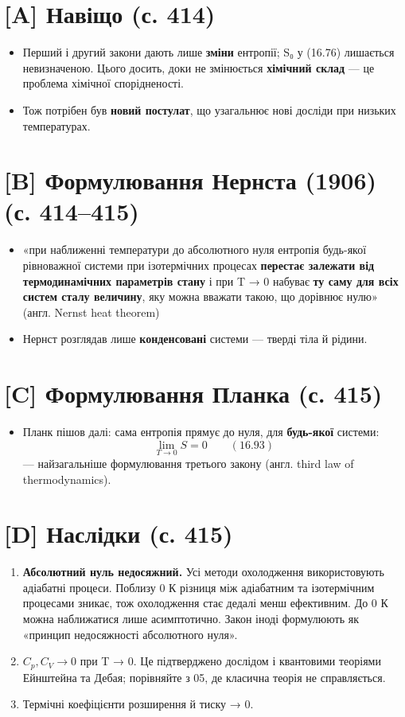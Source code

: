\documentclass[11pt,a4paper,oneside]{book}
\begin{document}
\section*{[A] Навіщо (с. 414)}
\begin{itemize}
\item Перший і другий закони дають лише \textbf{зміни} ентропії; S₀ у (16.76) лишається невизначеною. Цього досить, доки не змінюється \textbf{хімічний склад} — це проблема хімічної спорідненості.
\item Тож потрібен був \textbf{новий постулат}, що узагальнює нові досліди при низьких температурах.
\end{itemize}

\section*{[B] Формулювання Нернста (1906) (с. 414–415)}
\begin{itemize}
\item «при наближенні температури до абсолютного нуля ентропія будь-якої рівноважної системи при ізотермічних процесах \textbf{перестає залежати від термодинамічних параметрів стану} і при T → 0 набуває \textbf{ту саму для всіх систем сталу величину}, яку можна вважати такою, що дорівнює нулю» (англ. Nernst heat theorem)
\item Нернст розглядав лише \textbf{конденсовані} системи — тверді тіла й рідини.
\end{itemize}

\section*{[C] Формулювання Планка (с. 415)}
\begin{itemize}
\item Планк пішов далі: сама ентропія прямує до нуля, для \textbf{будь-якої} системи:
\[\lim_{T\to0}S = 0\qquad(16.93)\]
— найзагальніше формулювання третього закону (англ. third law of thermodynamics).
\end{itemize}

\section*{[D] Наслідки (с. 415)}
\begin{enumerate}
\item \textbf{Абсолютний нуль недосяжний.} Усі методи охолодження використовують адіабатні процеси. Поблизу 0 К різниця між адіабатним та ізотермічним процесами зникає, тож охолодження стає дедалі менш ефективним. До 0 К можна наближатися лише асимптотично. Закон іноді формулюють як «принцип недосяжності абсолютного нуля».
\item $C_p, C_V \to 0$ при T → 0. Це підтверджено дослідом і квантовими теоріями Ейнштейна та Дебая; порівняйте з 05, де класична теорія не справляється.
\item Термічні коефіцієнти розширення й тиску → 0.
\end{enumerate}
\end{document}
